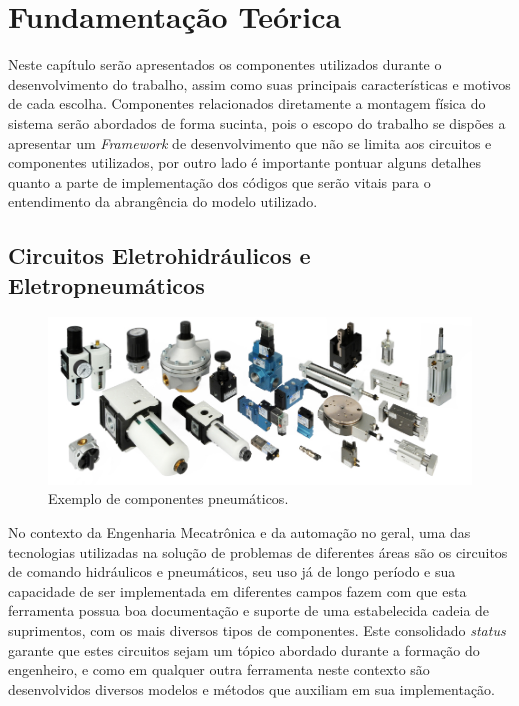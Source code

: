 \chapter[Fundamentação Teórica]{Fundamentação Teórica}

Neste capítulo serão apresentados os componentes utilizados durante o desenvolvimento do trabalho, assim como suas 
principais características e motivos de cada escolha. Componentes relacionados diretamente a montagem física do sistema
serão abordados de forma sucinta, pois o escopo do trabalho se dispões a apresentar um \textit{Framework} de desenvolvimento
que não se limita aos circuitos e componentes utilizados, por outro lado é importante pontuar alguns detalhes quanto a 
parte de implementação dos códigos que serão vitais para o entendimento da abrangência do modelo utilizado.

\section{Circuitos Eletrohidráulicos e Eletropneumáticos}

\begin{figure}[htb]
    \begin{center}
	    \includegraphics[scale=0.5]{figs/set-pneumatica.jpg}
	\end{center}
	\caption{Exemplo de componentes pneumáticos.} 
\end{figure}

No contexto da Engenharia Mecatrônica e da automação no geral, uma das  tecnologias utilizadas na solução de
problemas de diferentes áreas são os circuitos de comando hidráulicos e pneumáticos, seu  uso já de longo período e
sua capacidade de ser implementada em diferentes campos fazem com que esta ferramenta possua boa documentação e suporte
de uma estabelecida cadeia de suprimentos, com os mais diversos tipos de componentes. Este consolidado \textit{status} garante 
que estes circuitos sejam um tópico abordado durante a formação do engenheiro, e como em qualquer outra 
ferramenta neste contexto são desenvolvidos diversos modelos e métodos que auxiliam em sua implementação. 

